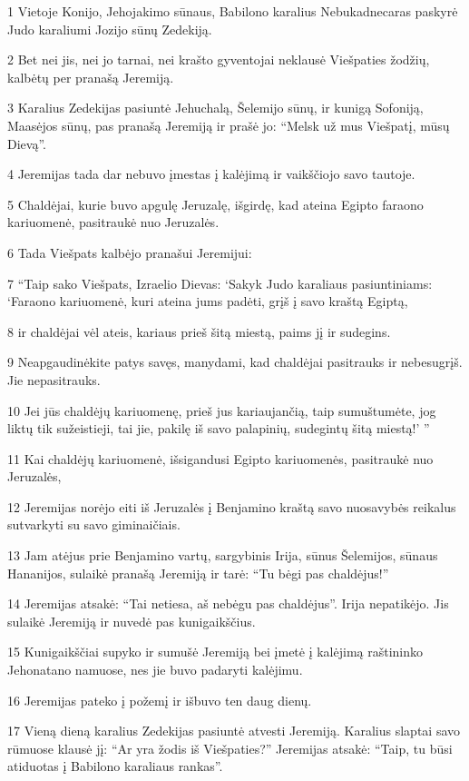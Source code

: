 \par 1 Vietoje Konijo, Jehojakimo sūnaus, Babilono karalius Nebukadnecaras paskyrė Judo karaliumi Jozijo sūnų Zedekiją. 
\par 2 Bet nei jis, nei jo tarnai, nei krašto gyventojai neklausė Viešpaties žodžių, kalbėtų per pranašą Jeremiją. 
\par 3 Karalius Zedekijas pasiuntė Jehuchalą, Šelemijo sūnų, ir kunigą Sofoniją, Maasėjos sūnų, pas pranašą Jeremiją ir prašė jo: “Melsk už mus Viešpatį, mūsų Dievą”. 
\par 4 Jeremijas tada dar nebuvo įmestas į kalėjimą ir vaikščiojo savo tautoje. 
\par 5 Chaldėjai, kurie buvo apgulę Jeruzalę, išgirdę, kad ateina Egipto faraono kariuomenė, pasitraukė nuo Jeruzalės. 
\par 6 Tada Viešpats kalbėjo pranašui Jeremijui: 
\par 7 “Taip sako Viešpats, Izraelio Dievas: ‘Sakyk Judo karaliaus pasiuntiniams: ‘Faraono kariuomenė, kuri ateina jums padėti, grįš į savo kraštą Egiptą, 
\par 8 ir chaldėjai vėl ateis, kariaus prieš šitą miestą, paims jį ir sudegins. 
\par 9 Neapgaudinėkite patys savęs, manydami, kad chaldėjai pasitrauks ir nebesugrįš. Jie nepasitrauks. 
\par 10 Jei jūs chaldėjų kariuomenę, prieš jus kariaujančią, taip sumuštumėte, jog liktų tik sužeistieji, tai jie, pakilę iš savo palapinių, sudegintų šitą miestą!’ ” 
\par 11 Kai chaldėjų kariuomenė, išsigandusi Egipto kariuomenės, pasitraukė nuo Jeruzalės, 
\par 12 Jeremijas norėjo eiti iš Jeruzalės į Benjamino kraštą savo nuosavybės reikalus sutvarkyti su savo giminaičiais. 
\par 13 Jam atėjus prie Benjamino vartų, sargybinis Irija, sūnus Šelemijos, sūnaus Hananijos, sulaikė pranašą Jeremiją ir tarė: “Tu bėgi pas chaldėjus!” 
\par 14 Jeremijas atsakė: “Tai netiesa, aš nebėgu pas chaldėjus”. Irija nepatikėjo. Jis sulaikė Jeremiją ir nuvedė pas kunigaikščius. 
\par 15 Kunigaikščiai supyko ir sumušė Jeremiją bei įmetė į kalėjimą raštininko Jehonatano namuose, nes jie buvo padaryti kalėjimu. 
\par 16 Jeremijas pateko į požemį ir išbuvo ten daug dienų. 
\par 17 Vieną dieną karalius Zedekijas pasiuntė atvesti Jeremiją. Karalius slaptai savo rūmuose klausė jį: “Ar yra žodis iš Viešpaties?” Jeremijas atsakė: “Taip, tu būsi atiduotas į Babilono karaliaus rankas”. 
